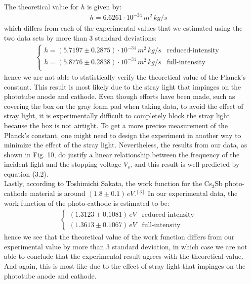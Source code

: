 \documentclass[11pt]{book}
\theoremstyle{break}
\theoremstyle{break}
\begin{document}
The theoretical value for $h$ is given by:
\begin{align*}
h = 6.6261 \cdot 10^{-34}\, m^2 \,kg /s
\end{align*}
which differs from each of the experimental values that we estimated using the two data sets by more than $3$ standard deviations:
\begin{align*}
\begin{cases}
h=(5.7197\pm 0.2875) \cdot 10^{-34} \, m^2 \,kg /s  & \text{reduced-intensity}\\
h=(5.8776\pm 0.2838) \cdot 10^{-34} \, m^2 \,kg /s  & \text{full-intensity}\\
\end{cases}
\end{align*}
hence we are not able to statistically verify the theoretical value of the Planck's constant. This result is most likely due to the stray light that impinges on the phototube anode and cathode. Even though efforts have been made, such as covering the box on the gray foam pad when taking data, to avoid the effect of stray light, it is experimentally difficult to completely block the stray light because the box is not airtight. To get a more precise measurement of the Planck's constant, one might need to design the experiment in another way to minimize the effect of the stray light. Nevertheless, the results from our data, as shown in Fig. 10, do justify a linear relationship between the frequency of the incident light and the stopping voltage $V_s$, and this result is well predicted by equation (3.2).\\

Lastly, according to Toshimichi Sakata, the work function for the Cs$_3$Sb photo-cathode material is around $(1.8\pm0.1)\, eV$.$^{[3]}$ In our experimental data, the work function of the photo-cathode is estimated to be:
\begin{align*}
\begin{cases}
(1.3123\pm 0.1081)\, eV & \text{reduced-intensity}\\
(1.3613 \pm 0.1067)\, eV& \text{full-intensity}
\end{cases}
\end{align*}
hence we see that the theoretical value of the work function differs from our experimental value by more than $3$ standard deviation, in which case we are not able to conclude that the experimental result agrees with the theoretical value. And again, this is most like due to the effect of stray light that impinges on the phototube anode and cathode.\\
\end{document}
